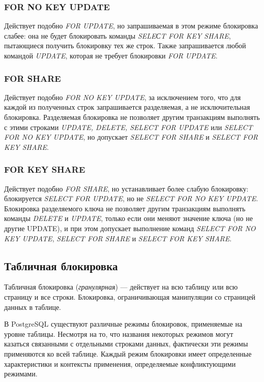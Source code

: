 \subsubsection*{FOR NO KEY UPDATE}

Действует подобно \textit{FOR UPDATE}, но запрашиваемая в этом режиме блокировка слабее: она не будет блокировать команды \textit{SELEСT FOR KEY SHARE}, пытающиеся получить блокировку тех же строк.
Также запрашивается любой командой \textit{UPDATE}, которая не требует блокировки \textit{FOR UPDATE}.

\subsubsection*{FOR SHARE}

Действует подобно \textit{FOR NO KEY UPDATE}, за исключением того, что для каждой из полученных строк запрашивается разделяемая, а не исключительная блокировка. Разделяемая блокировка не позволяет другим транзакциям выполнять с этими строками \textit{UPDATE, DELETE, SELECT FOR UPDATE} или \textit{SELECT FOR NO KEY UPDATE}, но допускает \textit{SELECT FOR SHARE} и \textit{SELECT FOR KEY SHARE}.

\subsubsection*{FOR KEY SHARE}

Действует подобно \textit{FOR SHARE}, но устанавливает более слабую блокировку: блокируется \textit{SELECT FOR UPDATE}, но не \textit{SELECT FOR NO KEY UPDATE}.
Блокировка разделяемого ключа не позволяет другим транзакциям выполнять команды \textit{DELETE} и \textit{UPDATE}, только если они меняют значение ключа (но не другие UPDATE), и при этом допускает выполнение команд \textit{SELECT FOR NO KEY UPDATE}, \textit{SELECT FOR SHARE} и \textit{SELECT FOR KEY SHARE}.

\subsection{Табличная блокировка}

Табличная блокировка (\textit{гранулярная}) --- действует на всю таблицу или всю страницу и все строки.
Блокировка, ограничивающая манипуляции со страницей данных в таблице.

В PostgreSQL существуют различные режимы блокировок, применяемые на уровне таблицы. 
Несмотря на то, что названия некоторых режимов могут казаться связанными с отдельными строками данных, фактически эти режимы применяются ко всей таблице. 
Каждый режим блокировки имеет определенные характеристики и контексты применения, определяемые конфликтующими режимами.

